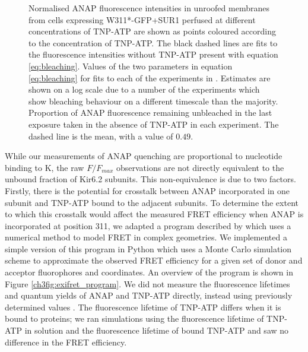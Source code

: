 \begin{figure}[hbtp]
\begin{subfigure}[t]{0.45\textwidth}
	\end{subfigure}
	\caption[Unroofed membranes bleaching correction]{
	 Normalised ANAP fluorescence intensities in unroofed membranes from cells expressing W311*-GFP+SUR1 perfused at different concentrations of TNP-ATP are shown as points coloured according to the concentration of TNP-ATP.
	The black dashed lines are fits to the fluorescence intensities without TNP-ATP present with equation \ref{eq:bleaching}.
	 Values of the two parameters in equation \ref{eq:bleaching} for fits to each of the experiments in .
	Estimates are shown on a log scale due to a number of the experiments which show bleaching behaviour on a different timescale than the majority.
	 Proportion of ANAP fluorescence remaining unbleached in the last exposure taken in the absence of TNP-ATP in each experiment.
	The dashed line is the mean, with a value of $0.49$.
	}
\end{figure}

While our measurements of ANAP quenching are proportional to nucleotide binding to K\ATP{}, the raw $F/F_{max}$ observations are not directly equivalent to the unbound fraction of Kir6.2 subunits.
This non-equivalence is due to two factors.
Firstly, there is the potential for crosstalk between ANAP incorporated in one subunit and TNP-ATP bound to the adjacent subunits.
To determine the extent to which this crosstalk would affect the measured FRET efficiency when ANAP is incorporated at position 311, we adapted a program described by \textcite{deplazes_exifret_2012} which uses a numerical method to model FRET in complex geometries.
We implemented a simple version of this program in Python which uses a Monte Carlo simulation scheme to approximate the observed FRET efficiency for a given set of donor and acceptor fluorophores and coordinates.
An overview of the program is shown in Figure \ref{ch3fig:exifret_program}.
We did not measure the fluorescence lifetimes and quantum yields of ANAP and TNP-ATP directly, instead using previously determined values \cite{zagotta_measuring_2016-1, ye_spectroscopic_1999, ishikawa_single-molecule_2002}.
The fluorescence lifetime of TNP-ATP differs when it is bound to proteins; we ran simulations using the fluorescence lifetime of TNP-ATP in solution and the fluorescence lifetime of bound TNP-ATP and saw no difference in the FRET efficiency.


